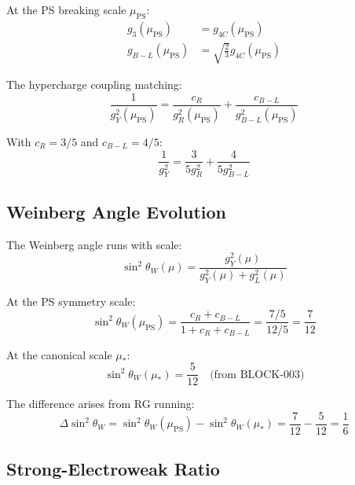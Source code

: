 \documentclass[11pt,a4paper]{article}
\theoremstyle{definition}
\begin{document}
At the PS breaking scale $\mu_{\text{PS}}$:
\begin{align}
  \label{eq:match-g3}
  g_3(\mu_{\text{PS}}) &= g_{4C}(\mu_{\text{PS}}) \\
  \label{eq:match-gbl}
  g_{B-L}(\mu_{\text{PS}}) &= \sqrt{\frac{2}{3}} g_{4C}(\mu_{\text{PS}})
\end{align}

The hypercharge coupling matching:
\begin{equation}
  \label{eq:match-gy}
  \frac{1}{g_Y^2(\mu_{\text{PS}})} = \frac{c_R}{g_R^2(\mu_{\text{PS}})} + \frac{c_{B-L}}{g_{B-L}^2(\mu_{\text{PS}})}
\end{equation}

With $c_R = 3/5$ and $c_{B-L} = 4/5$:
\begin{equation}
  \label{eq:match-gy-explicit}
  \frac{1}{g_Y^2} = \frac{3}{5g_R^2} + \frac{4}{5g_{B-L}^2}
\end{equation}

\subsection{Weinberg Angle Evolution}
\label{subsec:weinberg-evolve}

The Weinberg angle runs with scale:
\begin{equation}
  \label{eq:weinberg-run-1}
  \sin^2\theta_W(\mu) = \frac{g_Y^2(\mu)}{g_Y^2(\mu) + g_L^2(\mu)}
\end{equation}

At the PS symmetry scale:
\begin{equation}
  \label{eq:weinberg-ps}
  \sin^2\theta_W(\mu_{\text{PS}}) = \frac{c_R + c_{B-L}}{1 + c_R + c_{B-L}} = \frac{7/5}{12/5} = \frac{7}{12}
\end{equation}

At the canonical scale $\mu_*$:
\begin{equation}
  \label{eq:weinberg-mustar}
  \sin^2\theta_W(\mu_*) = \frac{5}{12} \quad \text{(from BLOCK-003)}
\end{equation}

The difference arises from RG running:
\begin{equation}
  \label{eq:weinberg-diff}
  \Delta\sin^2\theta_W = \sin^2\theta_W(\mu_{\text{PS}}) - \sin^2\theta_W(\mu_*) = \frac{7}{12} - \frac{5}{12} = \frac{1}{6}
\end{equation}

\subsection{Strong-Electroweak Ratio}
\label{subsec:strong-ew-ratio}
\end{document}

